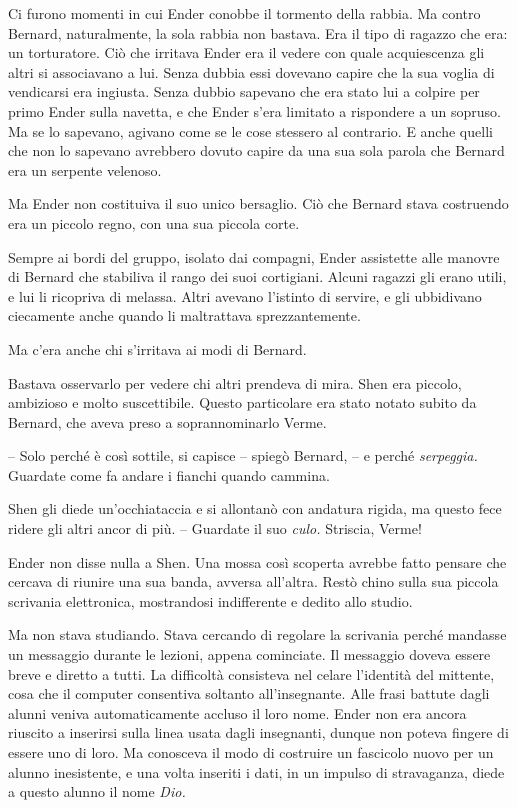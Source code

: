 {Ci furono momenti in cui Ender conobbe il tormento della rabbia. Ma
	contro Bernard, naturalmente, la sola rabbia non bastava. Era il tipo di
	ragazzo che era: un torturatore. Ciò che irritava Ender era il vedere
	con quale acquiescenza gli altri si associavano a lui. Senza dubbia essi
	dovevano capire che la sua voglia di vendicarsi era ingiusta. Senza
	dubbio sapevano che era stato lui a colpire per primo Ender sulla
	navetta, e che Ender s'era limitato a rispondere a un sopruso. Ma se lo
	sapevano, agivano come se le cose stessero al contrario. E anche quelli
	che non lo sapevano avrebbero dovuto capire da una sua sola parola che
	Bernard era un serpente velenoso.}

{Ma Ender non costituiva il suo unico bersaglio. Ciò che Bernard stava
	costruendo era un piccolo regno, con una sua piccola corte.}

{Sempre ai bordi del gruppo, isolato dai compagni, Ender assistette alle
	manovre di Bernard che stabiliva il rango dei suoi cortigiani. Alcuni
	ragazzi gli erano utili, e lui li ricopriva di melassa. Altri avevano
	l'istinto di servire, e gli ubbidivano ciecamente anche quando li
	maltrattava sprezzantemente.}

{Ma c'era anche chi s'irritava ai modi di Bernard.}

{Bastava osservarlo per vedere chi altri prendeva di mira. Shen era
	piccolo, ambizioso e molto suscettibile. Questo particolare era stato
	notato subito da Bernard, che aveva preso a soprannominarlo Verme.}

{-- Solo perché è così sottile, si capisce -- spiegò Bernard, -- e
	perché \emph{serpeggia.} Guardate come fa andare i fianchi quando
	cammina.}

{Shen gli diede un'occhiataccia e si allontanò con andatura rigida, ma
	questo fece ridere gli altri ancor di più. -- Guardate il suo
	\emph{culo.} Striscia, Verme!}

{Ender non disse nulla a Shen. Una mossa così scoperta avrebbe fatto
	pensare che cercava di riunire una sua banda, avversa all'altra. Restò
	chino sulla sua piccola scrivania elettronica, mostrandosi indifferente
	e dedito allo studio.}

{Ma non stava studiando. Stava cercando di regolare la scrivania perché
	mandasse un messaggio durante le lezioni, appena cominciate. Il
	messaggio doveva essere breve e diretto a tutti. La difficoltà
	consisteva nel celare l'identità del mittente, cosa che il computer
	consentiva soltanto all'insegnante. Alle frasi battute dagli alunni
	veniva automaticamente accluso il loro nome. Ender non era ancora
	riuscito a inserirsi sulla linea usata dagli insegnanti, dunque non
	poteva fingere di essere uno di loro. Ma conosceva il modo di costruire
	un fascicolo nuovo per un alunno inesistente, e una volta inseriti i
	dati, in un impulso di stravaganza, diede a questo alunno il nome
	\emph{Dio.}}


